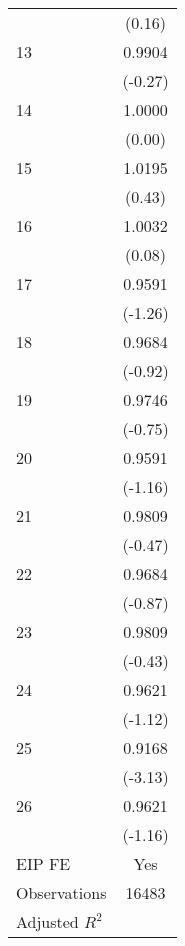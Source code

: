 {\begin{tabular}{l*{1}{c}}
                                   &      (0.16)         \\
[1em]
   13                              &      0.9904         \\
                                   &     (-0.27)         \\
[1em]
   14                              &      1.0000         \\
                                   &      (0.00)         \\
[1em]
   15                              &      1.0195         \\
                                   &      (0.43)         \\
[1em]
   16                              &      1.0032         \\
                                   &      (0.08)         \\
[1em]
   17                              &      0.9591         \\
                                   &     (-1.26)         \\
[1em]
   18                              &      0.9684         \\
                                   &     (-0.92)         \\
[1em]
   19                              &      0.9746         \\
                                   &     (-0.75)         \\
[1em]
   20                              &      0.9591         \\
                                   &     (-1.16)         \\
[1em]
   21                              &      0.9809         \\
                                   &     (-0.47)         \\
[1em]
   22                              &      0.9684         \\
                                   &     (-0.87)         \\
[1em]
   23                              &      0.9809         \\
                                   &     (-0.43)         \\
[1em]
   24                              &      0.9621         \\
                                   &     (-1.12)         \\
[1em]
   25                              &      0.9168\sym{***}\\
                                   &     (-3.13)         \\
[1em]
   26                              &      0.9621         \\
                                   &     (-1.16)         \\
[1em]
EIP FE                             &         Yes         \\
\hline
Observations                       &       16483         \\
Adjusted \(R^{2}\)                 &                     \\
\hline\hline
\end{tabular}
}
